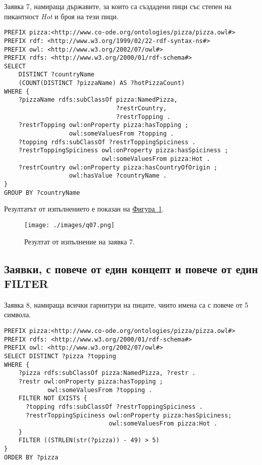 \documentclass[12pt]{article}
\begin{document}
\clearpage
\pagebreak

        Заявка 7, намираща държавите, за които са създадени пици със степен на пикантност \textit{Hot} и броя на тези пици.
        
        \begin{lstlisting}[language=SPARQL,style=sparql]
PREFIX pizza:<http://www.co-ode.org/ontologies/pizza/pizza.owl#>
PREFIX rdf: <http://www.w3.org/1999/02/22-rdf-syntax-ns#>
PREFIX owl: <http://www.w3.org/2002/07/owl#>
PREFIX rdfs: <http://www.w3.org/2000/01/rdf-schema#>
SELECT
    DISTINCT ?countryName
    (COUNT(DISTINCT ?pizzaName) AS ?hotPizzaCount)
WHERE {
    ?pizzaName rdfs:subClassOf pizza:NamedPizza,
                               ?restrCountry,
                               ?restrTopping .
    ?restrTopping owl:onProperty pizza:hasTopping ;
                  owl:someValuesFrom ?topping .
    ?topping rdfs:subClassOf ?restrToppingSpiciness .
    ?restrToppingSpiciness owl:onProperty pizza:hasSpiciness ;
                           owl:someValuesFrom pizza:Hot .
    ?restrCountry owl:onProperty pizza:hasCountryOfOrigin ;
                  owl:hasValue ?countryName .
}
GROUP BY ?countryName\end{lstlisting}

        Резултатът от изпълнението е показан на \hyperref[fig:q07]{Фигура~\ref*{fig:q07}}.

        \begin{center}
            \begin{figure}
            \centering
                \texttt{[image: ./images/q07.png]}
                \caption{Резултат от изпълнение на заявка 7.}
                \label{fig:q07}
            \end{figure}
        \end{center}
                
\clearpage
\pagebreak

    \subsection{Заявки, с повече от един концепт и повече от един FILTER}

        Заявка 8, намираща всички гарнитури на пиците, чиито имена са с повече от 5 символа.
        
        \begin{lstlisting}[language=SPARQL,style=sparql]
PREFIX pizza:<http://www.co-ode.org/ontologies/pizza/pizza.owl#>
PREFIX rdfs: <http://www.w3.org/2000/01/rdf-schema#>
PREFIX owl: <http://www.w3.org/2002/07/owl#>
SELECT DISTINCT ?pizza ?topping
WHERE {
    ?pizza rdfs:subClassOf pizza:NamedPizza, ?restr .
    ?restr owl:onProperty pizza:hasTopping ;
            owl:someValuesFrom ?topping .
    FILTER NOT EXISTS {
      ?topping rdfs:subClassOf ?restrToppingSpiciness .
      ?restrToppingSpiciness owl:onProperty pizza:hasSpiciness;
                             owl:someValuesFrom pizza:Hot .
    }
    FILTER ((STRLEN(str(?pizza)) - 49) > 5)
}
ORDER BY ?pizza\end{lstlisting}
\end{document}
